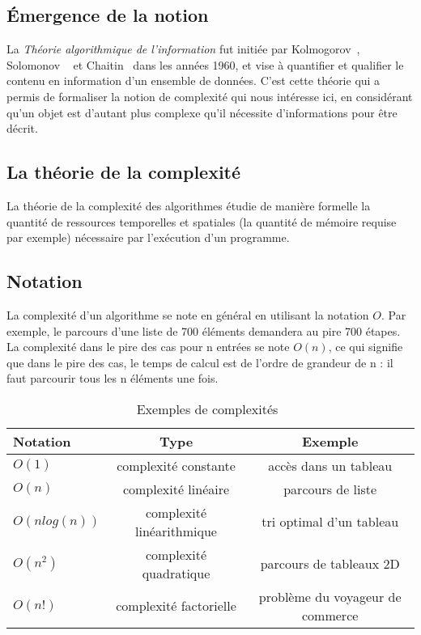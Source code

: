 \subsection{Émergence de la notion}
La \emph{Théorie algorithmique de l'information} fut initiée par Kolmogorov~\cite{ref.kol}, Solomonov%
~\cite{ref.sol} et Chaitin~\cite{ref.cha}
dans les années 1960, et vise à quantifier et qualifier le contenu en information d'un ensemble de données.
C'est cette théorie qui a permis de formaliser la notion de complexité qui nous intéresse ici,
en considérant qu'un objet est d'autant plus complexe qu'il nécessite d'informations pour être décrit.
\subsection{La théorie de la complexité}
La théorie de la complexité des algorithmes étudie de manière formelle la quantité de ressources
temporelles et spatiales (la quantité de mémoire requise par exemple) nécessaire
par l'exécution d'un programme.
\subsection{Notation} La complexité d'un algorithme se note en général en utilisant
la notation $O$.
Par exemple, le parcours d'une liste de 700 éléments demandera au pire 700 étapes.
La complexité dans le pire des cas pour n entrées se note $O(n)$, ce qui signifie que dans le pire
des cas, le temps de calcul est de l'ordre de grandeur de n : il faut parcourir tous les n
éléments une fois.

\begin{center}
    \begin{table}[h]
        \begin{tabular}{| l | c | c |}
            \hline
            Notation & Type & Exemple \\
            \hline
            $O(1)$ & complexité constante & accès dans un tableau\\
            $O(n)$ & complexité linéaire & parcours de liste\\
            $O(n log(n))$ & complexité linéarithmique & tri optimal d'un tableau\\
            $O(n^{2})$  & complexité quadratique & parcours de tableaux 2D\\
            $O(n!)$ & complexité factorielle & problème du voyageur de commerce\\
            \hline
        \end{tabular}
        \caption{Exemples de complexités~\cite{ref.table}}
    \end{table}
\end{center}


